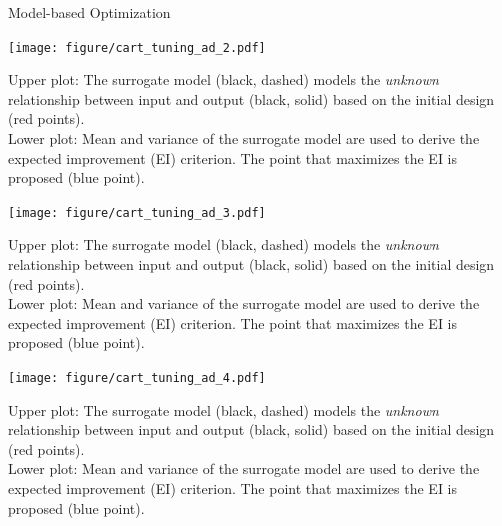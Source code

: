 \documentclass[11pt,compress,t,notes=noshow, xcolor=table]{beamer}
\newenvironment{knitrout}{}{} %
\begin{document}
\begin{vbframe}{Model-based Optimization}
\framebreak 

\begin{knitrout}\scriptsize
{}\color{fgcolor}

{\centering \texttt{[image: figure/cart\_tuning\_ad\_2.pdf]} 
}


\end{knitrout}
  \begin{footnotesize}
Upper plot: The surrogate model (black, dashed) models the \emph{unknown} relationship between input and output (black, solid) based on the initial design (red points).\\
Lower plot: Mean and variance of the surrogate model are used to derive the expected improvement (EI) criterion. The point that maximizes the EI is proposed (blue point). 
\end{footnotesize}
\framebreak

\begin{knitrout}\scriptsize
{}\color{fgcolor}

{\centering \texttt{[image: figure/cart\_tuning\_ad\_3.pdf]} 
}


\end{knitrout}
  \begin{footnotesize}
Upper plot: The surrogate model (black, dashed) models the \emph{unknown} relationship between input and output (black, solid) based on the initial design (red points).\\
Lower plot: Mean and variance of the surrogate model are used to derive the expected improvement (EI) criterion. The point that maximizes the EI is proposed (blue point). 
\end{footnotesize}
\framebreak

\begin{knitrout}\scriptsize
{}\color{fgcolor}

{\centering \texttt{[image: figure/cart\_tuning\_ad\_4.pdf]} 
}


\end{knitrout}
  \begin{footnotesize}
Upper plot: The surrogate model (black, dashed) models the \emph{unknown} relationship between input and output (black, solid) based on the initial design (red points).\\
Lower plot: Mean and variance of the surrogate model are used to derive the expected improvement (EI) criterion. The point that maximizes the EI is proposed (blue point). 
\end{footnotesize}
\framebreak


\end{vbframe}
\end{document}
